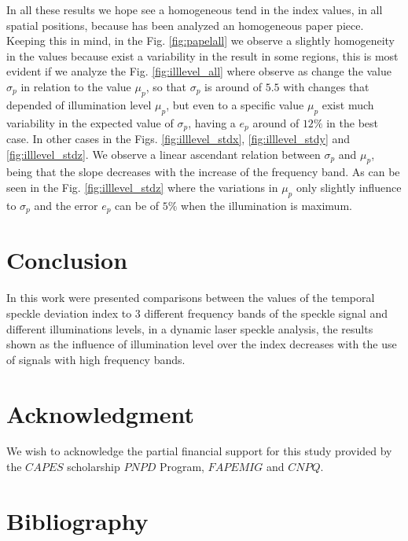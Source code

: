 \documentclass[review]{elsarticle}
\begin{document}
In all these results we hope see a homogeneous tend in the index values,
in all spatial positions, because has been analyzed an homogeneous paper piece.
Keeping this in mind, in the Fig. \ref{fig:papelall} we observe
a  slightly homogeneity in the values because exist a variability in 
the result in some regions, this is most evident if we analyze the Fig. \ref{fig:illlevel_all}
where observe as change the value $\sigma_p$ in relation to the value $\mu_p$,
so that
$\sigma_p$ is around of $5.5$ with changes that depended of illumination level $\mu_p$,
but even to a specific value $\mu_p$ exist much variability in the expected value of $\sigma_p$,
having a $e_p$ around of $12\%$ in the best case. In other cases in the Figs. \ref{fig:illlevel_stdx},
\ref{fig:illlevel_stdy} and \ref{fig:illlevel_stdz}. We observe a linear ascendant relation
between $\sigma_p$ and $\mu_p$, being that the slope decreases with 
the increase of the frequency band. As can be seen in the Fig. \ref{fig:illlevel_stdz}
where the variations in $\mu_p$  only slightly influence to $\sigma_p$ and the error $e_p$
can be of $5\%$ when the illumination is maximum. 

\section{Conclusion} 

In this work were presented comparisons between the values of the temporal speckle 
deviation index to 3 different frequency bands of the speckle signal and
different illuminations levels, in a
dynamic laser speckle analysis, the results shown as the influence of illumination level over
the index decreases with the use of signals with high frequency bands.


\section{Acknowledgment}
We wish to acknowledge the partial financial support for this study provided by the $CAPES$ 
scholarship
$PNPD$ Program, $FAPEMIG$ and $CNPQ$.

\section{Bibliography}


\end{document}
